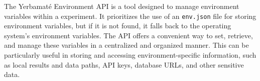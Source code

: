 The Yerbamaté Environment API is a tool designed to manage environment variables within a experiment. It prioritizes the use of an \texttt{env.json} file for storing environment variables, but if it is not found, it falls back to the operating system's environment variables. The API offers a convenient way to set, retrieve, and manage these variables in a centralized and organized manner. This can be particularly useful in storing and accessing environment-specific information, such as local results and data paths, API keys, database URLs, and other sensitive data.









